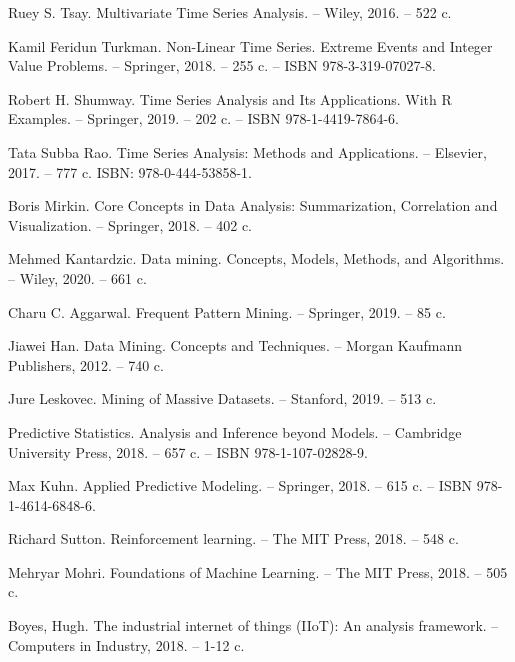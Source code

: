 \begin{thebibliography}{00}
    Ruey S. Tsay.
    Multivariate Time Series Analysis.
    -- Wiley, 2016. -- 522 c.

    Kamil Feridun Turkman.
    Non-Linear Time Series.
    Extreme Events and Integer Value Problems.
    -- Springer, 2018. -- 255 c.
    -- ISBN 978-3-319-07027-8.

    Robert H. Shumway.
    Time Series Analysis and Its Applications.
    With R Examples.
    -- Springer, 2019. -- 202 c.
    -- ISBN 978-1-4419-7864-6.

    Tata Subba Rao.
    Time Series Analysis: Methods and Applications.
    -- Elsevier, 2017. -- 777 c.
    ISBN: 978-0-444-53858-1.

    Boris Mirkin.
    Core Concepts in Data
    Analysis: Summarization, Correlation and Visualization.
    -- Springer, 2018. -- 402 c.

    Mehmed Kantardzic.
    Data mining.
    Concepts, Models, Methods, and Algorithms.
    -- Wiley, 2020. -- 661 c.

    Charu C. Aggarwal.
    Frequent Pattern Mining.
    -- Springer, 2019. -- 85 c.

    Jiawei Han.
    Data Mining.
    Concepts and Techniques.
    -- Morgan Kaufmann Publishers, 2012. -- 740 c.

    Jure Leskovec.
    Mining of Massive Datasets.
    -- Stanford, 2019. -- 513 c.

    Predictive Statistics.
    Analysis and Inference beyond Models.
    -- Cambridge University Press, 2018. -- 657 c.
    -- ISBN 978-1-107-02828-9.

    Max Kuhn.
    Applied Predictive Modeling.
    -- Springer, 2018. -- 615 c.
    -- ISBN 978-1-4614-6848-6.

    Richard Sutton.
    Reinforcement learning.
    -- The MIT Press, 2018. -- 548 c.

    Mehryar Mohri.
    Foundations of Machine Learning.
    -- The MIT Press, 2018. -- 505 c.

    Boyes, Hugh.
    The industrial internet of things (IIoT): An analysis framework.
    -- Computers in Industry, 2018. -- 1-12 c.


\end{thebibliography}

